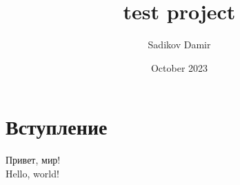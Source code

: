 \documentclass[a4paper, 12pt]{report}
\title{test project}
\author{Sadikov Damir}
\date{October 2023}
\begin{document}
	
	\maketitle
	
	\section{Вступление}
	Привет, мир!\\
	Hello, world!
	
\end{document}
